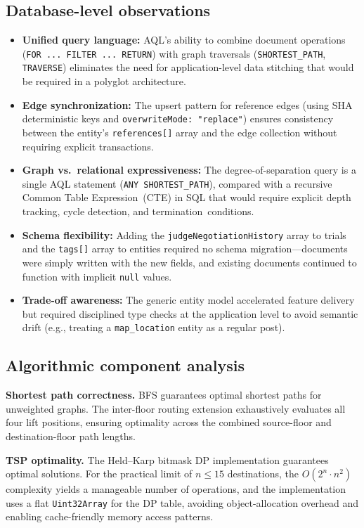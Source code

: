 \documentclass[13pt,a4paper]{report}
\begin{document}
\subsection{Database-level observations}
\begin{itemize}
    \item \textbf{Unified query language:} AQL's ability to combine document operations (\texttt{FOR ...\ FILTER ...\ RETURN}) with graph traversals (\texttt{SHORTEST\_PATH}, \texttt{TRAVERSE}) eliminates the need for application-level data stitching that would be required in a polyglot architecture.
    \item \textbf{Edge synchronization:} The upsert pattern for reference edges (using SHA deterministic keys and \texttt{overwrite\-Mode: "replace"}) ensures consistency between the entity's \texttt{references[]} array and the edge collection without requiring explicit transactions.
    \item \textbf{Graph vs.\ relational expressiveness:} The degree-of-separation query is a single AQL statement (\texttt{ANY SHORTEST\_\allowbreak PATH}), compared with a recursive Common Table Expression~(CTE) in SQL that would require explicit depth tracking, cycle detection, and termination~conditions.
    \item \textbf{Schema flexibility:} Adding the \texttt{judgeNegotiationHistory} array to trials and the \texttt{tags[]} array to entities required no schema migration---documents were simply written with the new fields, and existing documents continued to function with implicit \texttt{null} values.
    \item \textbf{Trade-off awareness:} The generic entity model accelerated feature delivery but required disciplined type checks at the application level to avoid semantic drift (e.g., treating a \texttt{map\_location} entity as a regular post).
\end{itemize}

\subsection{Algorithmic component analysis}
\textbf{Shortest path correctness.} BFS guarantees optimal shortest paths for unweighted graphs. The inter-floor routing extension exhaustively evaluates all four lift positions, ensuring optimality across the combined source-floor and destination-floor path lengths.

\textbf{TSP optimality.} The Held--Karp bitmask DP implementation guarantees optimal solutions. For the practical limit of $n \leq 15$ destinations, the $O(2^n \cdot n^2)$ complexity yields a manageable number of operations, and the implementation uses a flat \texttt{Uint32Array} for the DP table, avoiding object-allocation overhead and enabling cache-friendly memory access patterns.
\end{document}
